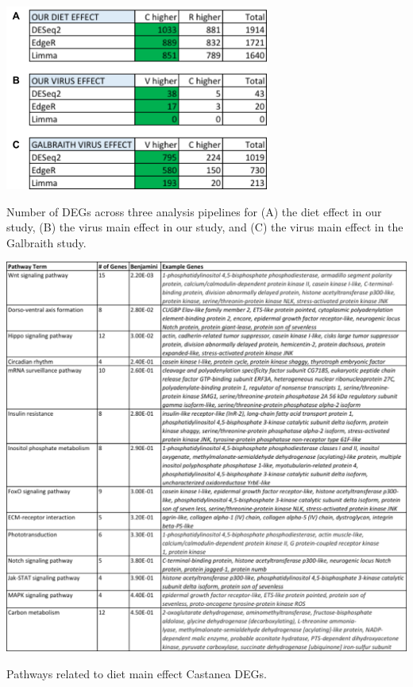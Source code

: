\documentclass[11pt,a4paper,oldfontcommands,openany]{memoir}
\numberwithin{equation}{section} %
\begin{document}
\begin{table}[H]
  \includegraphics[width=0.65\textwidth]{Images/mainEffectDEGs}
  \caption{Number of DEGs across three analysis pipelines for (A) the diet effect in our study, (B) the virus main effect in our study, and (C) the virus main effect in the Galbraith study.}
  \label{tbl:mainEffectDEGs}
\end{table}

\begin{table}[H]
  \includegraphics[width=\textwidth]{Images/CastaneaPathways}
  \caption{Pathways related to diet main effect Castanea DEGs.}
  \label{tbl:CastaneaPathways}
\end{table}
\end{document}
